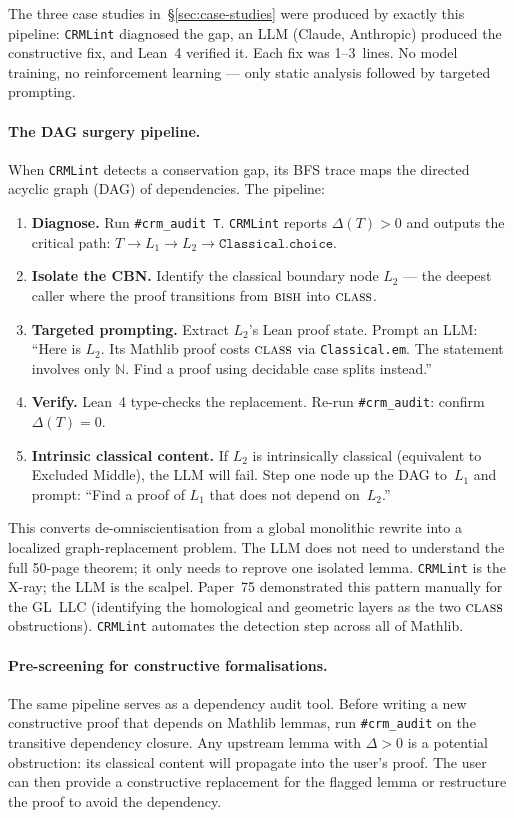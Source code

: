 \documentclass[12pt, a4paper]{article}
\theoremstyle{plain}
\theoremstyle{definition}
\theoremstyle{remark}
\newcommand{\BISH}{\textsc{bish}}
\newcommand{\CLASS}{\textsc{class}}
\newcommand{\CRMLint}{\texttt{CRMLint}}
\begin{document}
The three case studies in~\S\ref{sec:case-studies} were produced by
exactly this pipeline: \CRMLint{} diagnosed the gap, an LLM (Claude,
Anthropic) produced the constructive fix, and Lean~4 verified it.
Each fix was 1--3~lines.  No model training, no reinforcement learning
--- only static analysis followed by targeted prompting.

\paragraph{The DAG surgery pipeline.}
When \CRMLint{} detects a conservation gap, its BFS trace maps the
directed acyclic graph (DAG) of dependencies.  The pipeline:
\begin{enumerate}[nosep]
\item \textbf{Diagnose.}  Run \texttt{\#crm\_audit~T}.
  \CRMLint{} reports $\Delta(T) > 0$ and outputs the critical
  path: $T \to L_1 \to L_2 \to \texttt{Classical.choice}$.
\item \textbf{Isolate the CBN.}  Identify the classical boundary
  node $L_2$ --- the deepest caller where the proof transitions
  from $\BISH$ into $\CLASS$.
\item \textbf{Targeted prompting.}  Extract $L_2$'s Lean proof
  state.  Prompt an LLM: ``Here is $L_2$.  Its Mathlib proof
  costs $\CLASS$ via \texttt{Classical.em}.  The statement involves
  only $\mathbb{N}$.  Find a proof using decidable case splits
  instead.''
\item \textbf{Verify.}  Lean~4 type-checks the replacement.
  Re-run \texttt{\#crm\_audit}: confirm $\Delta(T) = 0$.
\item \textbf{Intrinsic classical content.}  If $L_2$ is
  intrinsically classical (equivalent to Excluded Middle), the
  LLM will fail.  Step one node up the DAG to~$L_1$ and prompt:
  ``Find a proof of $L_1$ that does not depend on~$L_2$.''
\end{enumerate}
This converts de-omniscientisation from a global monolithic rewrite
into a localized graph-replacement problem.  The LLM does not need
to understand the full 50-page theorem; it only needs to reprove
one isolated lemma.  \CRMLint{} is the X-ray; the LLM is the
scalpel.  Paper~75 demonstrated this pattern manually for the
GL~LLC (identifying the homological and geometric layers as the
two $\CLASS$ obstructions).  \CRMLint{} automates the detection
step across all of Mathlib.

\paragraph{Pre-screening for constructive formalisations.}
The same pipeline serves as a dependency audit tool.  Before writing
a new constructive proof that depends on Mathlib lemmas, run
\texttt{\#crm\_audit} on the transitive dependency closure.  Any
upstream lemma with $\Delta > 0$ is a potential obstruction: its
classical content will propagate into the user's proof.  The user
can then provide a constructive replacement for the flagged lemma
or restructure the proof to avoid the dependency.
\end{document}
